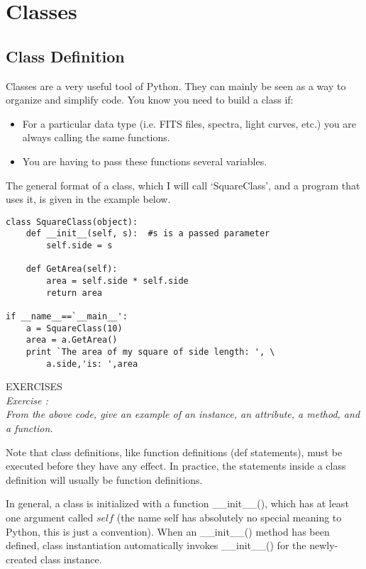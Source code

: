 \chapter{Classes}
\label{ch:classes}

\section{Class Definition}
\label{s:classes}
Classes are a very useful tool of Python.  They can mainly be seen as
a way to organize and simplify code.  You know you need to build a
class if:
\begin{itemize}
\item For a particular data type (i.e. FITS files, spectra, light
  curves, etc.) you are always calling the same functions.
\item You are having to pass these functions several variables.
\end{itemize}

The general format of a class, which I will call `SquareClass', and a
program that uses it, is given in the example below.  

\begin{verbatim}
class SquareClass(object):
    def __init__(self, s):  #s is a passed parameter
        self.side = s

    def GetArea(self):
        area = self.side * self.side
        return area

if __name__==`__main__':
    a = SquareClass(10)
    area = a.GetArea()
    print `The area of my square of side length: ', \
        a.side,'is: ',area
\end{verbatim}
{\color{blue} {\sf\small EXERCISES}} \\
{\it Exercise  :  \\
  From the above code, give an example of an instance, an attribute,
  a method, and a function.}

Note that class definitions, like function definitions (def
statements), must be executed before they have any effect.  In
practice, the statements inside a class definition will usually be
function definitions.

In general, a class is initialized with a function {\sf \small
  \_\_init\_\_()}, which has at least one argument called $self$ (the
name self has absolutely no special meaning to Python, this is just a
convention).  When an {\sf \small \_\_init\_\_()} method has been
defined, class instantiation automatically invokes {\sf \small
  \_\_init\_\_()} for the newly-created class instance.

